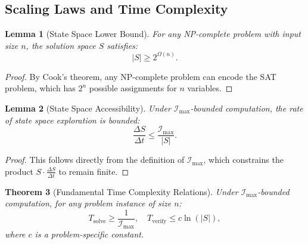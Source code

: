\documentclass[12pt]{article}
\newtheorem{theorem}{Theorem}
\newtheorem{lemma}{Lemma}
\begin{document}
\subsection{Scaling Laws and Time Complexity}

\newtheorem{theorem}{Theorem}[section]
\newtheorem{corollary}{Corollary}[theorem]
\newtheorem{lemma}[theorem]{Lemma}

\begin{lemma}[State Space Lower Bound]
For any NP-complete problem with input size \(n\), the solution space \(S\) satisfies:
\[
|S| \geq 2^{\Omega(n)}.
\]
\end{lemma}

\begin{proof}
By Cook’s theorem, any NP-complete problem can encode the SAT problem, which has \(2^n\) possible assignments for \(n\) variables.
\end{proof}

\begin{lemma}[State Space Accessibility]
Under \(\mathcal{I}_{\text{max}}\)-bounded computation, the rate of state space exploration is bounded:
\[
\frac{\Delta S}{\Delta t} \leq \frac{\mathcal{I}_{\text{max}}}{|S|}.
\]
\end{lemma}

\begin{proof}
This follows directly from the definition of \(\mathcal{I}_{\text{max}}\), which constrains the product \(S \cdot \frac{\Delta S}{\Delta t}\) to remain finite.
\end{proof}

\begin{theorem}[Fundamental Time Complexity Relations]
Under \(\mathcal{I}_{\text{max}}\)-bounded computation, for any problem instance of size \(n\):
\[
T_{\text{solve}} \geq \frac{1}{\mathcal{I}_{\text{max}}}, \quad T_{\text{verify}} \leq c\ln(|S|),
\]
where \(c\) is a problem-specific constant.
\end{theorem}
\end{document}
